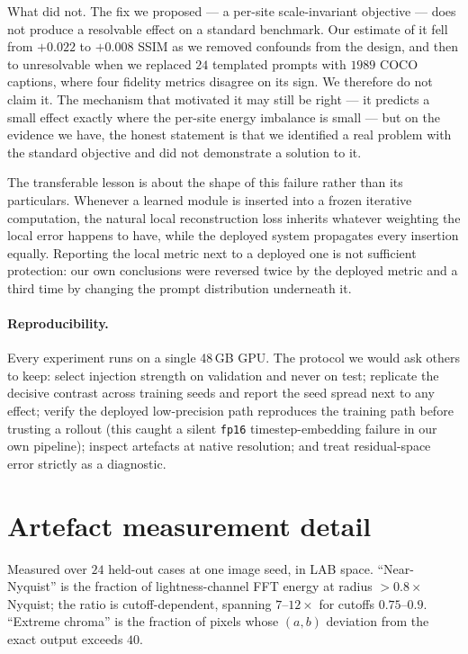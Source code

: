 What did not. The fix we proposed --- a per-site scale-invariant objective --- does not
produce a resolvable effect on a standard benchmark. Our estimate of it fell from
$+0.022$ to $+0.008$ SSIM as we removed confounds from the design, and then to
unresolvable when we replaced $24$ templated prompts with $1989$ COCO captions, where
four fidelity metrics disagree on its sign. We therefore do not claim it. The mechanism
that motivated it may still be right --- it predicts a small effect exactly where the
per-site energy imbalance is small --- but on the evidence we have, the honest statement
is that we identified a real problem with the standard objective and did not demonstrate
a solution to it.

The transferable lesson is about the shape of this failure rather than its particulars.
Whenever a learned module is inserted into a frozen iterative computation, the natural
local reconstruction loss inherits whatever weighting the local error happens to have,
while the deployed system propagates every insertion equally. Reporting the local metric
next to a deployed one is not sufficient protection: our own conclusions were reversed
twice by the deployed metric and a third time by changing the prompt distribution
underneath it.

\paragraph{Reproducibility.} Every experiment runs on a single 48\,GB GPU. The
protocol we would ask others to keep: select injection strength on validation and
never on test; replicate the decisive contrast across training seeds and report the
seed spread next to any effect; verify the deployed low-precision path reproduces the
training path before trusting a rollout (this caught a silent \texttt{fp16}
timestep-embedding failure in our own pipeline); inspect artefacts at native
resolution; and treat residual-space error strictly as a diagnostic.

\appendix
\section{Artefact measurement detail}
\label{app:artefactsdetail}

Measured over $24$ held-out cases at one image seed, in LAB space. ``Near-Nyquist'' is
the fraction of lightness-channel FFT energy at radius $>0.8\times$ Nyquist; the ratio
is cutoff-dependent, spanning $7$--$12\times$ for cutoffs $0.75$--$0.9$. ``Extreme
chroma'' is the fraction of pixels whose $(a,b)$ deviation from the exact output exceeds
$40$.

